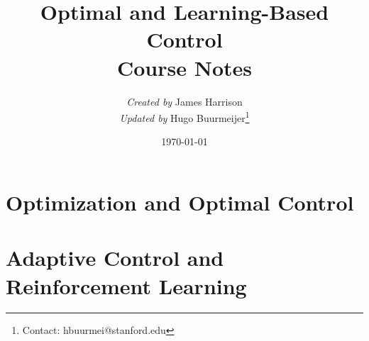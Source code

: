 \documentclass[12pt]{book}
\title{Optimal and Learning-Based Control\\
Course Notes}
\author{
    \textit{Created by} James Harrison \\
    \textit{Updated by} Hugo Buurmeijer\thanks{Contact: hbuurmei@stanford.edu}
}
\date{\today}
\begin{document}
\maketitle




\newpage
\tableofcontents

\newpage


\part{Optimization and Optimal Control}







\part{Adaptive Control and Reinforcement Learning}






% 

% 
% 




\end{document}
